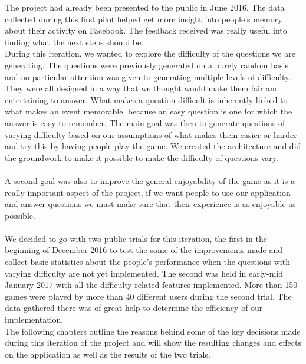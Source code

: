 The project had already been presented to the public in June 2016. The data collected during this first pilot helped get more insight into people's memory about their activity on Facebook. The feedback received was really useful into finding what the next steps should be.\\
During this iteration, we wanted to explore the difficulty of the questions we are generating. The questions were previously generated on a purely random basis and no particular attention was given to generating multiple levels of difficulty. They were all designed in a way that we thought would make them fair and entertaining to answer. What makes a question difficult is inherently linked to what makes an event memorable, because an easy question is one for which the answer is easy to remember. The main goal was then to generate questions of varying difficulty based on our assumptions of what makes them easier or harder and try this by having people play the game. We created the architecture and did the groundwork to make it possible to make the difficulty of questions vary.\\\\
A second goal was also to improve the general enjoyability of the game as it is a really important aspect of the project, if we want people to use our application and answer questions we must make sure that their experience is as enjoyable as possible.\\\\
We decided to go with two public trials for this iteration, the first in the beginning of December 2016 to test the some of the improvements made and collect basic statistics about the people's performance when the questions with varying difficulty are not yet implemented. The second was held in early-mid January 2017 with all the difficulty related features implemented. More than 150 games were played by more than 40 different users during the second trial. The data gathered there was of great help to determine the efficiency of our implementation.\\
The following chapters outline the reasons behind some of the key decisions made during this iteration of the project and will show the resulting changes and effects on the application as well as the results of the two trials.